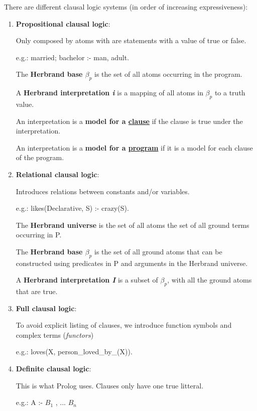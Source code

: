 There are different clausal logic systems (in order of increasing expressiveness):
\begin{enumerate}
\item \textbf{Propositional clausal logic}:

Only composed by atoms with are statements with a value of true or false.

e.g.: married; bachelor :- man, adult.

The \textbf{Herbrand base $\beta_p$} is the set of all atoms occurring in the program.

A \textbf{Herbrand interpretation \textit{i}} is a mapping of all atoms in $\beta_p$ to a truth value.

An interpretation is a \textbf{model for a \underline{clause}} if the clause is true under the interpretation.

An interpretation is a \textbf{model for a \underline{program}} if it is a model for each clause of the program.



\item \textbf{Relational clausal logic}:

Introduces relations between constants and/or variables.

e.g.: likes(Declarative, S) :- crazy(S).

The \textbf{Herbrand universe} is the set of all atoms the set of all ground terms occurring in P.

The \textbf{Herbrand base $\beta_p$} is the set of all ground atoms that can be constructed using predicates in P and arguments in the Herbrand universe.

A \textbf{Herbrand interpretation \textit{I}} is a subset of $\beta_p$, with all the ground atoms that are true.




\item \textbf{Full clausal logic}:

To avoid explicit listing of clauses, we introduce function symbols and complex terms (\textit{functors}) 

e.g.: loves(X, person\_loved\_by\_(X)).




\item \textbf{Definite clausal logic}:

This is what Prolog uses. Clauses only have one true litteral.

e.g.: A :- $B_1$ , ... $B_n$

\end{enumerate}
